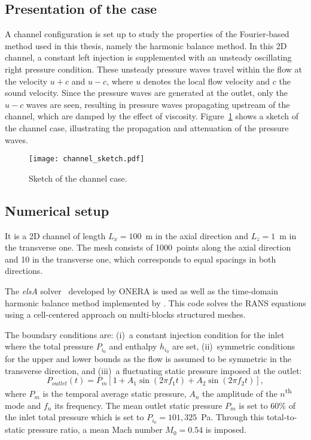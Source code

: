 \subsection{Presentation of the case}
\label{sub:presentation_of_the_case}

A channel configuration is set up to study the properties of the
Fourier-based method used in this thesis, namely the harmonic balance
method. In this 2D channel, a constant left injection is 
supplemented with an unsteady oscillating right pressure condition.
These unsteady pressure waves travel within the flow at the velocity $u + c$ and $u
- c$, where $u$ denotes the local flow velocity and $c$ the sound
velocity. Since the pressure waves are generated at the outlet, only
the $u-c$ waves are seen, resulting in pressure waves propagating
upstream of the channel, which are damped by the effect of
viscosity. Figure~\ref{fig:canal_principle} shows a sketch
of the channel case, illustrating the propagation and attenuation of
the pressure waves.
\begin{figure}[htb]
  \centering
  \texttt{[image: channel\_sketch.pdf]}
  \caption{Sketch of the channel case.}
  \label{fig:canal_principle}
\end{figure}

\subsection{Numerical setup}

It is a 2D channel of length $L_x = 100$~m in the axial
direction and $L_z = 1$~m in the transverse one.
The mesh consists of 1000~points along the axial direction and 10 in the
transverse one, which corresponds to equal spacings in both
directions.

The \emph{elsA} solver~\cite{Cambier2013} developed by ONERA
is used as well as the time-domain harmonic 
balance method implemented by \citet{JSicot2008}. 
This code solves the RANS equations using a cell-centered
approach on multi-blocks structured meshes.

The boundary conditions are: (i)~a constant injection condition for the inlet
where the total pressure $P_{i_0}$ and enthalpy $h_{i_0}$ are set,
(ii)~symmetric conditions for the upper and lower bounds as the flow
is assumed to be symmetric in the transverse direction, and (iii)~a
fluctuating static pressure imposed at the outlet:
\begin{equation}
  P_{outlet}(t) = P_m \left[1 + A_1 \sin(2 \pi f_1 t) +
    A_2 \sin(2 \pi f_2 t) \right],
  \label{eq:outlet_canal}
\end{equation}
where $P_m$ is the temporal average static pressure, $A_n$ the
amplitude of the $n$\textsuperscript{th} mode and $f_n$ its
frequency. The mean outlet static pressure $P_m$ is set to $60\%$ of the
inlet total pressure which is set to $P_{i_0} = 101,325$~Pa.
Through this total-to-static pressure ratio, a mean Mach
number $M_0 = 0.54$ is imposed.

